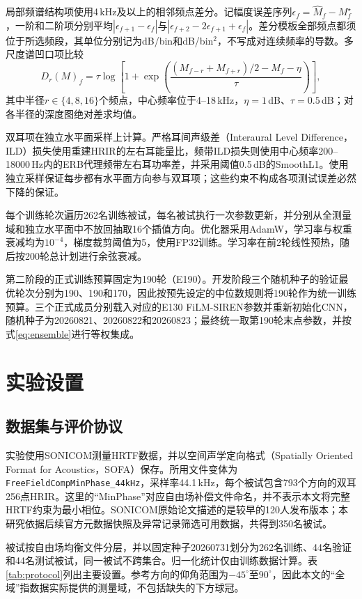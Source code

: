 \documentclass[UTF8,a4paper]{article}
\begin{document}
局部频谱结构项使用4\,kHz及以上的相邻频点差分。记幅度误差序列$\epsilon_f=\widehat M_f-M^\star_f$，一阶和二阶项分别平均$|\epsilon_{f+1}-\epsilon_f|$与$|\epsilon_{f+2}-2\epsilon_{f+1}+\epsilon_f|$。差分模板全部频点都须位于所选频段，其单位分别记为dB/bin和dB/bin$^2$，不写成对连续频率的导数。多尺度谱凹口项比较
\begin{equation}
D_r(M)_f=\tau\log\!\left[
1+\exp\!\left(
\frac{(M_{f-r}+M_{f+r})/2-M_f-\eta}{\tau}
\right)\right],
\end{equation}
其中半径$r\in\{4,8,16\}$个频点，中心频率位于4--18\,kHz，$\eta=1$\,dB、$\tau=0.5$\,dB；对各半径的深度图绝对差求均值。

双耳项在独立水平面采样上计算。严格耳间声级差（Interaural Level Difference，ILD）损失使用重建HRIR的左右耳能量比，频带ILD损失则使用中心频率200--18000\,Hz内的ERB代理频带左右耳功率差，并采用阈值0.5\,dB的SmoothL1。使用独立采样保证每步都有水平面方向参与双耳项；这些约束不构成各项测试误差必然下降的保证。

每个训练轮次遍历262名训练被试，每名被试执行一次参数更新，并分别从全测量域和独立水平面中不放回抽取16个插值方向。优化器采用AdamW，学习率与权重衰减均为$10^{-4}$，梯度裁剪阈值为5，使用FP32训练。学习率在前2轮线性预热，随后按200轮总计划进行余弦衰减。

第二阶段的正式训练预算固定为190轮（E190）。开发阶段三个随机种子的验证最优轮次分别为190、190和170，因此按预先设定的中位数规则将190轮作为统一训练预算。三个正式成员分别载入对应的E130 FiLM-SIREN参数并重新初始化CNN，随机种子为20260821、20260822和20260823；最终统一取第190轮末点参数，并按式\eqref{eq:ensemble}进行等权集成。

\section{实验设置}
\label{sec:setup}

\subsection{数据集与评价协议}
实验使用SONICOM测量HRTF数据\cite{R6}，并以空间声学定向格式（Spatially Oriented Format for Acoustics，SOFA）保存\cite{R8}。所用文件变体为\texttt{FreeFieldCompMinPhase\_44kHz}，采样率44.1\,kHz，每个被试包含793个方向的双耳256点HRIR。这里的“MinPhase”对应自由场补偿文件命名，并不表示本文将完整HRTF约束为最小相位。SONICOM原始论文描述的是较早的120人发布版本；本研究依据后续官方元数据快照及异常记录筛选可用数据，共得到350名被试。

被试按自由场均衡文件分层，并以固定种子20260731划分为262名训练、44名验证和44名测试被试，同一被试不跨集合。归一化统计仅由训练数据计算。表\ref{tab:protocol}列出主要设置。参考方向的仰角范围为$-45^\circ$至$90^\circ$，因此本文的“全域”指数据实际提供的测量域，不包括缺失的下方球冠。
\end{document}

